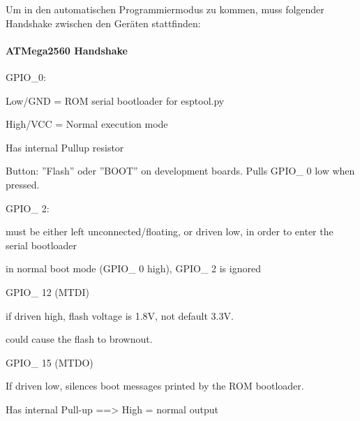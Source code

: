 Um in den automatischen Programmiermodus zu kommen, muss folgender Handshake zwischen den Geräten stattfinden:

\paragraph{ATMega2560 Handshake}\mbox{}

GPIO\_0:

Low/GND = ROM serial bootloader for esptool.py

High/VCC = Normal execution mode

Has internal Pullup resistor

Button: ''Flash'' oder ''BOOT'' on development boards. Pulls GPIO\_ 0 low when pressed.

GPIO\_ 2:

must be either left unconnected/floating, or driven low, in order to enter the serial bootloader

in normal boot mode (GPIO\_ 0 high), GPIO\_ 2 is ignored

GPIO\_ 12 (MTDI)

if driven high, flash voltage is 1.8V, not default 3.3V.

could cause the flash to brownout.

GPIO\_ 15 (MTDO)

If driven low, silences boot messages printed by the ROM bootloader.

Has internal Pull-up ==> High = normal output



%
